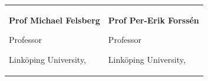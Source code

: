 

\begin{tabularx}{\textwidth}{@{}X X@{}}
\textbf{Prof Michael Felsberg}\par
Professor\par
Linköping University,\par 
\makefield{\faEnvelope[regular]}{\url{michael.felsberg@liu.se}}
& 
\textbf{Prof Per-Erik Forssén}\par
Professor\par
Linköping University,\par 
\makefield{\faEnvelope[regular]}{\url{per-erik.forssen@liu.se}}
\\
\end{tabularx}
